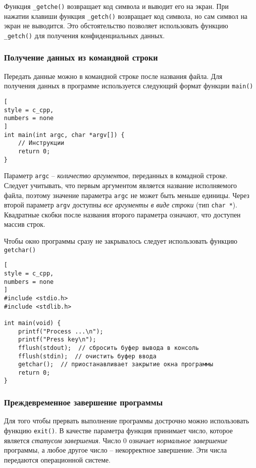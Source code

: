 \documentclass[%
	11pt,
	a4paper,
	utf8,
		]{article}
\begin{document}
Функция \verb*|_getche()| возвращает код символа и выводит его на экран. При нажатии клавиши функция \verb|_getch()| возвращает код символа, но сам символ на экран не выводится. Это обстоятельство позволяет использовать функцию \verb*|_getch()| для получения конфиденциальных данных.

\subsubsection{Получение данных из командной строки}

Передать данные можно в командной строке после названия файла. Для получения данных в программе используется следующий формат функции \verb|main()|
\begin{lstlisting}[
style = c_cpp,
numbers = none
]
int main(int argc, char *argv[]) {
    // Инструкции
    return 0;
}
\end{lstlisting}

Параметр \verb|argc| -- \emph{количество аргументов}, переданных в комадной строке. Следует учитывать, что первым аргументом является название исполняемого файла, поэтому значение параметра \verb*|argc| не может быть меньше единицы. Через второй параметр \verb*|argv| доступны \emph{все аргументы в виде строки} (тип \verb|char *|). Квадратные скобки после названия второго параметра означают, что доступен массив строк.

Чтобы окно программы сразу не закрывалось следует использовать функцию \verb|getchar()|
\begin{lstlisting}[
style = c_cpp,
numbers = none
]
#include <stdio.h>
#include <stdlib.h>

int main(void) {
    printf("Process ...\n");
    printf("Press key\n");
    fflush(stdout);  // сбросить буфер вывода в консоль
    fflush(stdin);  // очистить буфер ввода
    getchar();  // приостанавливает закрытие окна программы
    return 0;
}
\end{lstlisting}

\subsubsection{Преждевременное завершение программы}

Для того чтобы прервать выполнение программы дострочно можно использовать функцию \verb*|exit()|. В качестве параметра функция принимает число, которое является \emph{статусом завершения}. Число 0 означает \emph{нормальное завершение} программы, а любое другое число -- некорректное завершение. Эти числа передаются операционной системе.
\end{document}
